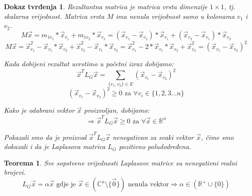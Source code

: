 \documentclass[11pt]{article}
\newtheorem{theorem}{Teorema}
\newtheorem*{custom_proof}{Dokaz tvrđenja}
\begin{document}
\begin{custom_proof}
	Rezultantna matrica je matrica vrsta dimenzije $1 \times 1$, tj. skalarna vrijednost. Matrica vrsta $M$ ima nenula vrijednost samo u kolonama $v_1$ i $v_2$.
	\[
	M \vec{x} = m_{1 v_1} * \vec{x}_{v_1} + m_{1 v_2} * \vec{x}_{v_2} =  (\vec{x}_{v_1} - \vec{x}_{v_2}) * \vec{x}_{v_1} + (\vec{x}_{v_2} - \vec{x}_{v_1}) * \vec{x}_{v_2} 
	\] 
	\[
	M \vec{x} =  \vec{x}_{v_1}^2 - \vec{x}_{v_1} * \vec{x}_{v_2} + \vec{x}_{v_2}^2 - \vec{x}_{v_1} * \vec{x}_{v_2} = \vec{x}_{v_1}^2 - 2 *\vec{x}_{v_1} * \vec{x}_{v_2} + \vec{x}_{v_2}^2 = (\vec{x}_{v_1} - \vec{x}_{v_2})^2   
	\] 

	Kada dobijeni rezultat uvrstimo u početni izraz dobijamo:
	\[
	  \vec{x}^TL_G\vec{x} = \sum_{\{v_1,v_2\} \in E} (\vec{x}_{v_1} - \vec{x}_{v_2})^2
	\]
	\[
	  (\vec{x}_{v_1} - \vec{x}_{v_2})^2 \geq 0 \text{ za } \forall v_i \in \{1,2,3 \dots n\} 
	\]

	Kako je odabrani vektor $\vec{x}$ proizvoljan, dobijamo:
	\[
	  \Rightarrow \vec{x}^TL_G\vec{x} \geq 0 \text{ za } \forall \vec{x} \in \mathbb{R}^n
	\]

	Pokazali smo da je proizvod $\vec{x}^TL_G\vec{x}$ nenegativan za svaki vektor $\vec{x}$, čime smo dokazali i da je Laplasova matrica $L_G$ pozitivno poludodređena.
	\end{custom_proof}
	
	\begin{theorem} Sve sopstvene vrijednosti Laplasove matrice su nenegativni realni brojevi.
	\[
	 L_G\vec{x} = \alpha \vec{x} \text{ gdje je } \vec{x} \in ( \mathbb{C}^n \setminus \{\vec{0}\}) \text{ nenula vektor} \Rightarrow \alpha \in (\mathbb{R}^+ \cup \{0\})
	\]
	\end{theorem}
	
\end{document}
